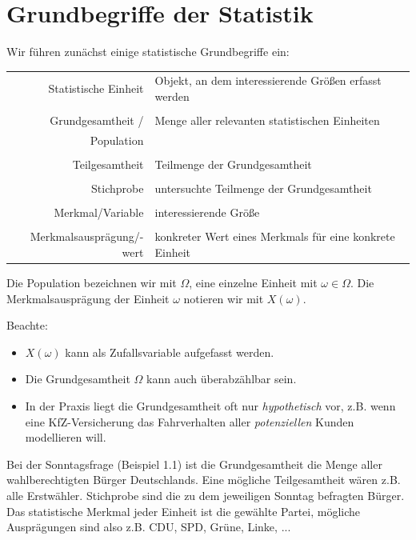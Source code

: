 \section{Grundbegriffe der Statistik}
Wir führen zunächst einige statistische Grundbegriffe ein:

\begin{tabular}{r|l}
  Statistische Einheit & Objekt, an dem interessierende Größen erfasst werden \\
  \\
  Grundgesamtheit / &  Menge aller relevanten statistischen Einheiten \\
  Population \\
  \\
  Teilgesamtheit & Teilmenge der Grundgesamtheit \\
  \\
  Stichprobe & untersuchte Teilmenge der Grundgesamtheit \\
  \\
  Merkmal/Variable & interessierende Größe \\
  \\
  Merkmalsausprägung/-wert & konkreter Wert eines Merkmals für eine
                             konkrete Einheit
\end{tabular}

Die Population bezeichnen wir mit $\Omega$, eine einzelne Einheit mit $\omega
\in \Omega$. Die Merkmalsausprägung der Einheit $\omega$ notieren wir mit
$X(\omega)$.

Beachte:
\begin{itemize}
\item $X(\omega)$ kann als Zufallsvariable aufgefasst werden.
\item Die Grundgesamtheit $\Omega$ kann auch überabzählbar sein.
\item In der Praxis liegt die Grundgesamtheit oft nur \emph{hypothetisch} vor,
  z.B. wenn eine KfZ-Versicherung das Fahrverhalten aller \emph{potenziellen}
  Kunden modellieren will.
\end{itemize}

\begin{exmp}
  Bei der Sonntagsfrage (Beispiel 1.1) ist die Grundgesamtheit die Menge aller
  wahlberechtigten Bürger Deutschlands. Eine mögliche Teilgesamtheit wären z.B.
  alle Erstwähler. Stichprobe sind die zu dem jeweiligen Sonntag befragten
  Bürger. Das statistische Merkmal jeder Einheit ist die gewählte Partei,
  mögliche Ausprägungen sind also z.B. CDU, SPD, Grüne, Linke, ...
\end{exmp}

